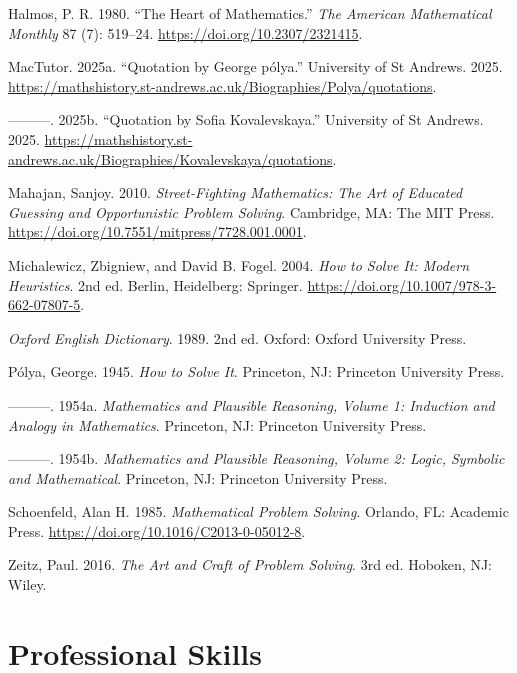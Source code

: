 \documentclass[
  a4paper,
  DIV=11,
  numbers=noendperiod,
  oneside]{scrreprt}
\newlength{\cslhangindent}
\newenvironment{CSLReferences}[2] %
 {\begin{list}{}{%
  \setlength{\itemindent}{0pt}
  \setlength{\leftmargin}{0pt}
  \setlength{\parsep}{0pt}
  \ifodd #1
   \setlength{\leftmargin}{\cslhangindent}
   \setlength{\itemindent}{-1\cslhangindent}
  \fi
  \setlength{\itemsep}{#2\baselineskip}}}
 {\end{list}}
\begin{document}
\label{refs}
\begin{CSLReferences}{1}{0}
Halmos, P. R. 1980. {``The Heart of Mathematics.''} \emph{The American
Mathematical Monthly} 87 (7): 519--24.
\url{https://doi.org/10.2307/2321415}.

MacTutor. 2025a. {``Quotation by George p{ó}lya.''} University of St
Andrews. 2025.
\url{https://mathshistory.st-andrews.ac.uk/Biographies/Polya/quotations}.

---------. 2025b. {``Quotation by Sofia Kovalevskaya.''} University of
St Andrews. 2025.
\url{https://mathshistory.st-andrews.ac.uk/Biographies/Kovalevskaya/quotations}.

Mahajan, Sanjoy. 2010. \emph{Street-Fighting Mathematics: The Art of
Educated Guessing and Opportunistic Problem Solving}. Cambridge, MA: The
MIT Press. \url{https://doi.org/10.7551/mitpress/7728.001.0001}.

Michalewicz, Zbigniew, and David B. Fogel. 2004. \emph{{How to Solve It:
Modern Heuristics}}. 2nd ed. Berlin, Heidelberg: Springer.
\url{https://doi.org/10.1007/978-3-662-07807-5}.

\emph{Oxford English Dictionary}. 1989. 2nd ed. Oxford: Oxford
University Press.

Pólya, George. 1945. \emph{{How to Solve It}}. Princeton, NJ: Princeton
University Press.

---------. 1954a. \emph{Mathematics and Plausible Reasoning, Volume 1:
Induction and Analogy in Mathematics}. Princeton, NJ: Princeton
University Press.

---------. 1954b. \emph{Mathematics and Plausible Reasoning, Volume 2:
Logic, Symbolic and Mathematical}. Princeton, NJ: Princeton University
Press.

Schoenfeld, Alan H. 1985. \emph{Mathematical Problem Solving}. Orlando,
FL: Academic Press. \url{https://doi.org/10.1016/C2013-0-05012-8}.

Zeitz, Paul. 2016. \emph{The Art and Craft of Problem Solving}. 3rd ed.
Hoboken, NJ: Wiley.

\end{CSLReferences}

\endgroup

\part{Professional Skills}
\end{document}
